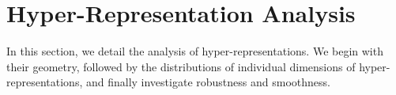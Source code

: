 



\newpage
\section{Hyper-Representation Analysis}
\label{app:analysis}
In this section, we detail the analysis of hyper-representations. We begin with their geometry, followed by the distributions of individual dimensions of hyper-representations, and finally investigate robustness and smoothness.

